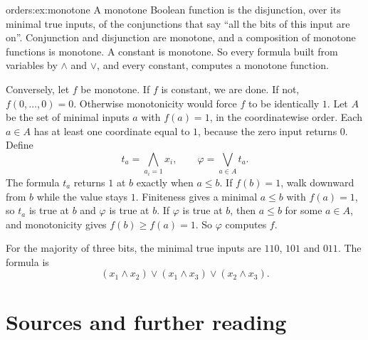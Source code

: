 \begin{solution}{orders:ex:monotone}
\idea A monotone Boolean function is the disjunction, over its minimal true inputs, of the conjunctions that say ``all the bits of this input are on''.
\writeup Conjunction and disjunction are monotone, and a composition of monotone functions is monotone. A constant is monotone. So every formula built from variables by $\land$ and $\lor$, and every constant, computes a monotone function.

Conversely, let $f$ be monotone. If $f$ is constant, we are done. If not, $f(0,\dots,0)=0$. Otherwise monotonicity would force $f$ to be identically $1$. Let $A$ be the set of minimal inputs $a$ with $f(a)=1$, in the coordinatewise order. Each $a\in A$ has at least one coordinate equal to $1$, because the zero input returns $0$. Define
\[
t_a=\bigwedge_{a_i=1}x_i,\qquad \varphi=\bigvee_{a\in A}t_a.
\]
The formula $t_a$ returns $1$ at $b$ exactly when $a\le b$. If $f(b)=1$, walk downward from $b$ while the value stays $1$. Finiteness gives a minimal $a\le b$ with $f(a)=1$, so $t_a$ is true at $b$ and $\varphi$ is true at $b$. If $\varphi$ is true at $b$, then $a\le b$ for some $a\in A$, and monotonicity gives $f(b)\ge f(a)=1$. So $\varphi$ computes $f$.

For the majority of three bits, the minimal true inputs are $110$, $101$ and $011$. The formula is
\[
(x_1\land x_2)\lor(x_1\land x_3)\lor(x_2\land x_3).
\]
\end{solution}

\section*{Sources and further reading}

